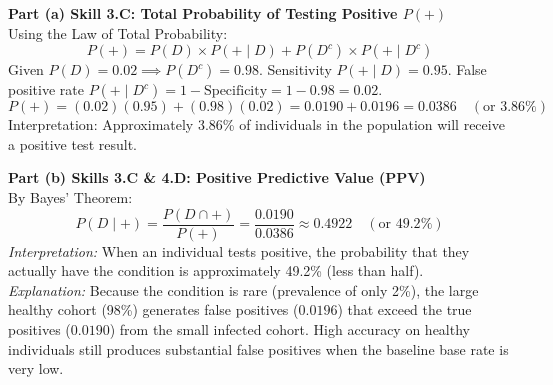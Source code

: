 \begin{frqrubricbox}
\textbf{Part (a) Skill 3.C: Total Probability of Testing Positive $P(+)$}\\
Using the Law of Total Probability:
\[ P(+) = P(D) \times P(+ \mid D) + P(D^c) \times P(+ \mid D^c) \]
Given $P(D) = 0.02 \implies P(D^c) = 0.98$.
Sensitivity $P(+ \mid D) = 0.95$.
False positive rate $P(+ \mid D^c) = 1 - \text{Specificity} = 1 - 0.98 = 0.02$.
\[ P(+) = (0.02)(0.95) + (0.98)(0.02) = 0.0190 + 0.0196 = 0.0386 \quad (\text{or } 3.86\%) \]
Interpretation: Approximately 3.86\% of individuals in the population will receive a positive test result.

\textbf{Part (b) Skills 3.C \& 4.D: Positive Predictive Value (PPV)}\\
By Bayes' Theorem:
\[ P(D \mid +) = \frac{P(D \cap +)}{P(+)} = \frac{0.0190}{0.0386} \approx 0.4922 \quad (\text{or } 49.2\%) \]
\textit{Interpretation:} When an individual tests positive, the probability that they actually have the condition is approximately 49.2\% (less than half).\\
\textit{Explanation:} Because the condition is rare (prevalence of only 2\%), the large healthy cohort (98\%) generates false positives ($0.0196$) that exceed the true positives ($0.0190$) from the small infected cohort. High accuracy on healthy individuals still produces substantial false positives when the baseline base rate is very low.


\end{frqrubricbox}
